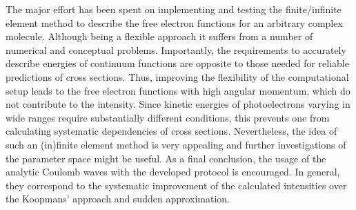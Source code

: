 The major effort has been spent on implementing and testing the finite/infinite element method to describe the free electron functions for an arbitrary complex molecule. Although being a flexible approach it suffers from a number of numerical and conceptual problems. Importantly, the requirements to accurately describe energies of continuum functions are opposite to those needed for reliable predictions of cross sections. Thus, improving the flexibility of the computational setup leads to the free electron functions with high angular momentum, which do not contribute to the intensity. Since kinetic energies of photoelectrons varying in wide ranges require substantially different conditions, this prevents one from calculating systematic dependencies of cross sections. Nevertheless, the idea of such an (in)finite element method is very appealing and further investigations of the parameter space might be useful.
As a final conclusion, the usage of the analytic Coulomb waves with the developed protocol is encouraged. In general, they correspond to the systematic improvement of the calculated intensities over the Koopmans' approach and sudden approximation.

